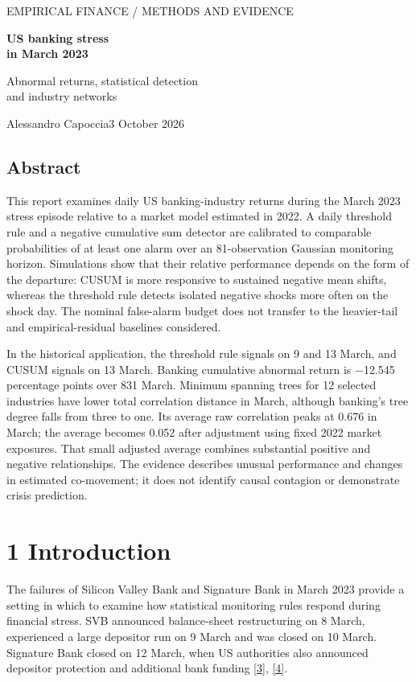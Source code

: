 \documentclass[11pt,a4paper]{article}
\begin{document}
{\sffamily\small\color{slate}EMPIRICAL FINANCE / METHODS AND EVIDENCE}\par\vspace{9pt}
{\sffamily\fontsize{28}{31}\selectfont\bfseries\color{navy}US banking stress\\in March 2023}\par\vspace{8pt}
{\sffamily\large\color{slate}Abnormal returns, statistical detection\\and industry networks}\par\vspace{10pt}
{\sffamily\normalsize Alessandro Capoccia\hfill 3 October 2026}\par\vspace{10pt}
\subsection*{Abstract}
This report examines daily US banking-industry returns during the March 2023 stress episode relative to a market model estimated in 2022. A daily threshold rule and a negative cumulative sum detector are calibrated to comparable probabilities of at least one alarm over an 81-observation Gaussian monitoring horizon. Simulations show that their relative performance depends on the form of the departure: CUSUM is more responsive to sustained negative mean shifts, whereas the threshold rule detects isolated negative shocks more often on the shock day. The nominal false-alarm budget does not transfer to the heavier-tail and empirical-residual baselines considered.

In the historical application, the threshold rule signals on 9 and 13 March, and CUSUM signals on 13 March. Banking cumulative abnormal return is $-$12.545 percentage points over 8\textendash{}31 March. Minimum spanning trees for 12 selected industries have lower total correlation distance in March, although banking's tree degree falls from three to one. Its average raw correlation peaks at 0.676 in March; the average becomes 0.052 after adjustment using fixed 2022 market exposures. That small adjusted average combines substantial positive and negative relationships. The evidence describes unusual performance and changes in estimated co-movement; it does not identify causal contagion or demonstrate crisis prediction.

\section*{1 Introduction}
The failures of Silicon Valley Bank and Signature Bank in March 2023 provide a setting in which to examine how statistical monitoring rules respond during financial stress. SVB announced balance-sheet restructuring on 8 March, experienced a large depositor run on 9 March and was closed on 10 March. Signature Bank closed on 12 March, when US authorities also announced depositor protection and additional bank funding \hyperlink{ref3}{[3]}, \hyperlink{ref4}{[4]}.
\end{document}
